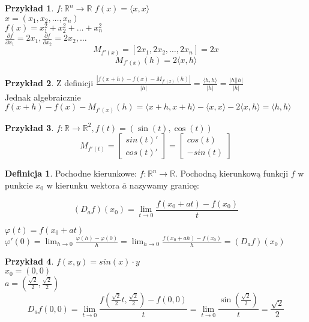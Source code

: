 \documentclass{article}
\theoremstyle{definition}
\newtheorem{de}{Definicja}[subsection]
\theoremstyle{definition}
\theoremstyle{definition}
\newtheorem{pk}{Przykład}[subsection]
\theoremstyle{definition}
\begin{document}
\begin{pk}
    $f:\mathbb{R}^n \rightarrow \mathbb{R}$ $f(x)=\langle x, x \rangle$\\
    $x=(x_1,x_2,\dots,x_n)$\\
    $f(x)=x_1^2+x_2^2+\dots+x_n^2$\\
    $\frac{\partial f}{\partial x_1} = 2x_1, \frac{\partial f}{\partial x_2} = 2x_2, \dots$\\
    $$M_{f'(x)} = \left[2x_1, 2x_2, \dots, 2x_n\right]=2x$$
    $$M_{f'(x)}(h) = 2\langle x,h\rangle$$
\end{pk}

\begin{pk}
    Z definicji $\frac{\left|f(x+h)-f(x)-M_{f'(x)}(h) \right|}{|h|}=\frac{\langle h,h \rangle}{|h|} = \frac{|h||h|}{|h|}$\\
    Jednak algebraicznie $f(x+h)-f(x)-M_{f'(x)}(h)=\langle x+h,x+h \rangle - \langle x, x \rangle - 2 \langle x, h \rangle=\langle h,h \rangle$
\end{pk}

\begin{pk}
    $f:\mathbb{R}\rightarrow \mathbb{R}^2, f(t)=(\sin(t),\cos(t))$\\
    $$
    M_{f'(t)} = \left[
        \begin{matrix}
        sin(t)'\\
        cos(t)'
        \end{matrix}
    \right]=\left[
        \begin{matrix}
            cos(t)\\
            -sin(t)
        \end{matrix}
    \right]
    $$
\end{pk}

\begin{de}
    Pochodne kierunkowe: $f: \mathbb{R}^n\rightarrow \mathbb{R}$. 
    Pochodną kierunkową funkcji $f$ w punkcie $x_0$ 
    w kierunku wektora $\overline{a}$ nazywamy granicę:
    \begin{center}
        \[(D_a f)(x_0)=\lim_{t\rightarrow 0} \frac{f(x_0 + at) - f(x_0)}{t}\]
    \end{center}
    $\varphi(t)=f(x_0+at)$\\
    $\varphi'(0)=\lim_{h\rightarrow 0} \frac{\varphi(h)-\varphi(0)}{h}=\lim_{h\rightarrow 0} \frac{f(x_0+ah)-f(x_0)}{h}=(D_a f)(x_0)$
\end{de}

\begin{pk}
    $f(x,y) = sin(x)\cdot y$\\
    $x_0 = (0,0)$\\
    $a=(\frac{\sqrt{2}}{2},\frac{\sqrt{2}}{2})$\\
    \[D_a f (0,0) = \lim_{t\rightarrow 0} \frac{f\left(\frac{\sqrt{2}}{2}t,\frac{\sqrt{2}}{2}\right)-f(0,0)}{t}=\lim_{t\rightarrow 0} \frac{\sin(\frac{\sqrt{2}}{2})}{t}=\frac{\sqrt{2}}{2}\]
\end{pk}
\end{document}
